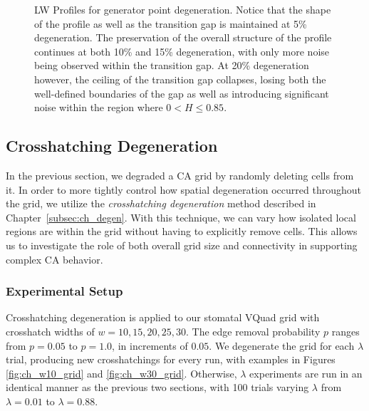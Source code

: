 \documentclass[a4paper,11pt]{article}
\begin{document}
\begin{figure}[htp]
\caption[Langton-Wootters Profile for Generator Point Degeneration]{
  LW Profiles for generator point degeneration. Notice that the shape of the profile as well as the transition gap is maintained at 5\% degeneration. The preservation of the overall structure of the profile continues at both 10\% and 15\% degeneration, with only more noise being observed within the transition gap. At 20\% degeneration however, the ceiling of the transition gap collapses, losing both the well-defined boundaries of the gap as well as introducing significant noise within the region where $0 < H \le 0.85$.
}
\label{fig:lw_gen_pt_degen}
\end{figure}

\subsection{Crosshatching Degeneration}

In the previous section, we degraded a CA grid by randomly deleting cells from it. In order to more tightly control how spatial degeneration occurred throughout the grid, we utilize the \textit{crosshatching degeneration} method described in Chapter~\ref{subsec:ch_degen}. With this technique, we can vary how isolated local regions are within the grid without having to explicitly remove cells. This allows us to investigate the role of both overall grid size and connectivity in supporting complex CA behavior.

\subsubsection*{Experimental Setup}
Crosshatching degeneration is applied to our stomatal VQuad grid with crosshatch widths of $w=10,15,20,25,30$. The edge removal probability $p$ ranges from $p=0.05$ to $p=1.0$, in increments of $0.05$. We degenerate the grid for each $\lambda$ trial, producing new crosshatchings for every run, with examples in Figures \ref{fig:ch_w10_grid} and \ref{fig:ch_w30_grid}. Otherwise, $\lambda$ experiments are run in an identical manner as the previous two sections, with 100 trials varying $\lambda$ from $\lambda=0.01$ to $\lambda=0.88$.
\end{document}
